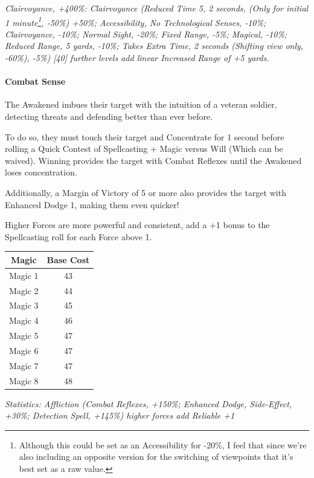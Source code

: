 \begin{multicols}{3}
	\textcolor{OliveGreen}{\textit{Clairvoyance, +400\%: Clairvoyance (Reduced Time 5, 2 seconds, (Only for initial 1 minute\footnote{Although this could be set as an Accessibility for -20\%, I feel that since we're also including an opposite version for the switching of viewpoints that it's best set as a raw value.}, -50\%) +50\%; Accessibility, No Technological Senses, -10\%; Clairvoyance, -10\%; Normal Sight, -20\%; Fixed Range, -5\%; Magical, -10\%; Reduced Range, 5 yards, -10\%; Takes Extra Time, 2 seconds (Shifting view only, -60\%), -5\%) [40] further levels add linear Increased Range of +5 yards.}}
	
	\paragraph{Combat Sense}
	
	The Awakened imbues their target with the intuition of a veteran soldier, detecting threats and defending better than ever before.
	
	To do so, they must touch their target and Concentrate for 1 second before rolling a Quick Contest of Spellcasting + Magic versus Will (Which can be waived). Winning provides the target with Combat Reflexes until the Awakened loses concentration.
	
	Additionally, a Margin of Victory of 5 or more also provides the target with Enhanced Dodge 1, making them even quicker!
	
	Higher Forces are more powerful and consistent, add a +1 bonus to the Spellcasting roll for each Force above 1.
	
	\begin{center}
		\begin{tabular}{|c|c|}
			\hline
			Magic & Base Cost \\
			\hline
			\hline
			Magic 1 & 43 \\
			Magic 2 & 44 \\
			Magic 3 & 45 \\
			Magic 4 & 46 \\
			Magic 5 & 47 \\
			Magic 6 & 47 \\
			Magic 7 & 47 \\
			Magic 8 & 48 \\
			\hline
		\end{tabular}
	\end{center} 	
	
	\textcolor{OliveGreen}{\textit{ Statistics: Affliction (Combat Reflexes, +150\%; Enhanced Dodge, Side-Effect, +30\%; Detection Spell, +145\%) higher forces add Reliable +1 }}
	

\end{multicols}
